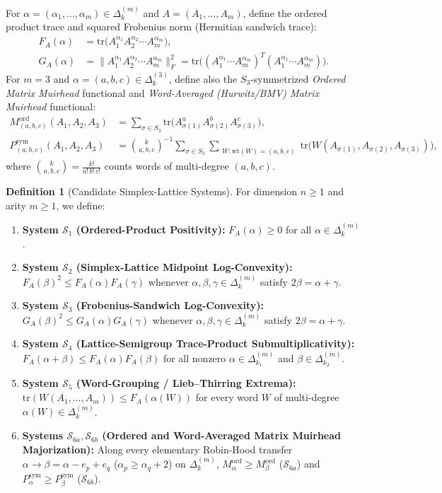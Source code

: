 \documentclass[11pt,a4paper]{article}
\theoremstyle{definition}
\newtheorem{definition}[theorem]{Definition}
\theoremstyle{remark}
\newcommand{\tr}{\mathrm{tr}}
\newcommand{\DeltaLat}{\Delta}
\newcommand{\Mord}{M^{\mathrm{ord}}}
\newcommand{\Psym}{P^{\mathrm{sym}}}
\begin{document}
For $\alpha = (\alpha_1,\dots,\alpha_m) \in \DeltaLat_k^{(m)}$ and $A = (A_1,\dots,A_m)$, define the ordered product trace and squared Frobenius norm (Hermitian sandwich trace):
\begin{align*}
F_A(\alpha) &= \tr\bigl(A_1^{\alpha_1} A_2^{\alpha_2} \cdots A_m^{\alpha_m}\bigr), \\
G_A(\alpha) &= \bigl\|A_1^{\alpha_1} A_2^{\alpha_2} \cdots A_m^{\alpha_m}\bigr\|_F^2
= \tr\bigl((A_1^{\alpha_1}\cdots A_m^{\alpha_m})^T (A_1^{\alpha_1}\cdots A_m^{\alpha_m})\bigr).
\end{align*}
For $m = 3$ and $\alpha = (a,b,c) \in \DeltaLat_k^{(3)}$, define also the $S_3$-symmetrized \emph{Ordered Matrix Muirhead} functional and \emph{Word-Averaged (Hurwitz/BMV) Matrix Muirhead} functional:
\begin{align*}
\Mord_{(a,b,c)}(A_1,A_2,A_3) &= \sum_{\sigma \in S_3} \tr\bigl(A_{\sigma(1)}^a A_{\sigma(2)}^b A_{\sigma(3)}^c\bigr), \\
\Psym_{(a,b,c)}(A_1,A_2,A_3) &= \binom{k}{a,b,c}^{-1} \sum_{\sigma \in S_3} \sum_{\substack{W : \mathrm{wt}(W)=(a,b,c)}} \tr\bigl(W(A_{\sigma(1)},A_{\sigma(2)},A_{\sigma(3)})\bigr),
\end{align*}
where $\binom{k}{a,b,c} = \frac{k!}{a!\,b!\,c!}$ counts words of multi-degree $(a,b,c)$.

\begin{definition}[Candidate Simplex-Lattice Systems]\label{def:systems}
For dimension $n \ge 1$ and arity $m \ge 1$, we define:
\begin{enumerate}
\item \textbf{System $\mathcal{S}_1$ (Ordered-Product Positivity):} $F_A(\alpha) \ge 0$ for all $\alpha \in \DeltaLat_k^{(m)}$.
\item \textbf{System $\mathcal{S}_2$ (Simplex-Lattice Midpoint Log-Convexity):} $F_A(\beta)^2 \le F_A(\alpha) F_A(\gamma)$ whenever $\alpha,\beta,\gamma \in \DeltaLat_k^{(m)}$ satisfy $2\beta = \alpha + \gamma$.
\item \textbf{System $\mathcal{S}_3$ (Frobenius-Sandwich Log-Convexity):} $G_A(\beta)^2 \le G_A(\alpha) G_A(\gamma)$ whenever $\alpha,\beta,\gamma \in \DeltaLat_k^{(m)}$ satisfy $2\beta = \alpha + \gamma$.
\item \textbf{System $\mathcal{S}_4$ (Lattice-Semigroup Trace-Product Submultiplicativity):} $F_A(\alpha + \beta) \le F_A(\alpha) F_A(\beta)$ for all nonzero $\alpha \in \DeltaLat_{k_1}^{(m)}$ and $\beta \in \DeltaLat_{k_2}^{(m)}$.
\item \textbf{System $\mathcal{S}_5$ (Word-Grouping / Lieb--Thirring Extrema):} $\tr(W(A_1,\dots,A_m)) \le F_A(\alpha(W))$ for every word $W$ of multi-degree $\alpha(W) \in \DeltaLat_k^{(m)}$.
\item \textbf{Systems $\mathcal{S}_{6a}, \mathcal{S}_{6b}$ (Ordered and Word-Averaged Matrix Muirhead Majorization):} Along every elementary Robin-Hood transfer $\alpha \to \beta = \alpha - e_p + e_q$ ($\alpha_p \ge \alpha_q + 2$) on $\DeltaLat_k^{(m)}$, $\Mord_\alpha \ge \Mord_\beta$ ($\mathcal{S}_{6a}$) and $\Psym_\alpha \ge \Psym_\beta$ ($\mathcal{S}_{6b}$).
\end{enumerate}
\end{definition}
\end{document}
